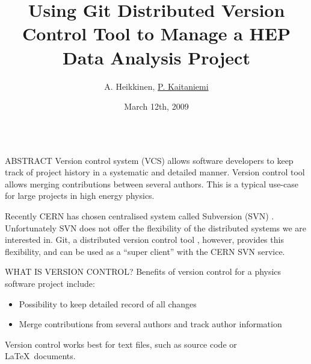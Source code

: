\documentclass[final,hyperref={pdfpagelabels=false},notitlepage=true]{beamer}
\title[]{\Huge Using Git Distributed Version Control Tool to Manage a HEP Data Analysis Project}
\author{A. Heikkinen\inst{1}, \underline{P. Kaitaniemi\inst{1,2}}}
\institute[] %
{
  \inst{1}%
  Helsinki Institute of Physics P.O.Box 64 (Gustaf H\"allstr\"omin katu 2), FIN-00014 University of Helsinki, Finland
  \\
  \inst{2}%
  CEN-Saclay, CEA-IRFU/SPhN, 91 191 Gif sur Yvette, France
}
\date[March 12th, 2009]{March 12th, 2009}
\begin{document}
  \begin{frame}{} 
    \vfill
    \begin{columns}[t]
      \begin{column}{0.45\linewidth}

    \begin{block}{\large ABSTRACT}
      \vskip1cm
Version control system (VCS) allows software developers to keep track of project history in
a {\color{orange} systematic} and {\color{orange} detailed} manner. 
Version control tool allows
merging contributions between several authors.
This is a typical use-case for large projects in high energy physics.


\vspace{1cm}

Recently {\color{orange} CERN has chosen centralised system called Subversion (SVN)} \cite{cernsvn}.
Unfortunately SVN does not offer the flexibility of the
distributed systems we are interested in. 
Git, a distributed version control tool \cite{torvalds}, however, 
provides this flexibility, 
and can be used as a ``super client'' with the CERN SVN service.




\end{block}

    \vskip2cm
    \begin{block}{\large WHAT IS VERSION CONTROL?}
      \vskip1cm
      Benefits of version control for a physics software project include:
      \begin{itemize}
        \item Possibility to keep detailed record of all changes
        \item Merge contributions from several authors and track author information
      \end{itemize}

      \vskip1cm
      Version control {\color{orange} works best for} text files, such as {\color{orange} source code} or \LaTeX\ documents.


\end{block}
\end{column}
\end{columns}
\end{frame}
\end{document}

